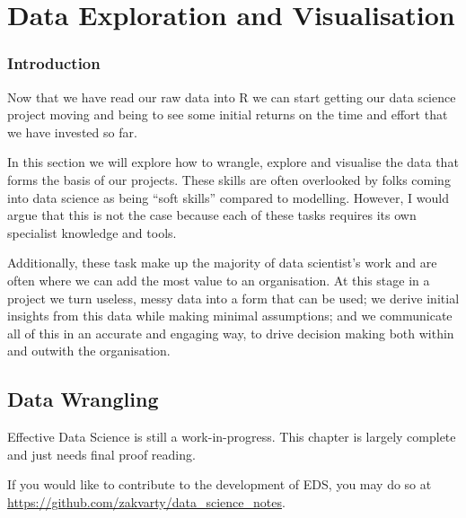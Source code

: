 \documentclass[
  letterpaper,
  DIV=11,
  numbers=noendperiod]{scrreprt}
\begin{document}
\part{Data Exploration and Visualisation}

\section*{Introduction}\label{edav-introduction}


Now that we have read our raw data into R we can start getting our data
science project moving and being to see some initial returns on the time
and effort that we have invested so far.

In this section we will explore how to wrangle, explore and visualise
the data that forms the basis of our projects. These skills are often
overlooked by folks coming into data science as being ``soft skills''
compared to modelling. However, I would argue that this is not the case
because each of these tasks requires its own specialist knowledge and
tools.

Additionally, these task make up the majority of data scientist's work
and are often where we can add the most value to an organisation. At
this stage in a project we turn useless, messy data into a form that can
be used; we derive initial insights from this data while making minimal
assumptions; and we communicate all of this in an accurate and engaging
way, to drive decision making both within and outwith the organisation.

\chapter{Data Wrangling}\label{edav-wrangling}

\begin{tcolorbox}[enhanced jigsaw, coltitle=black, opacityback=0, left=2mm, titlerule=0mm, breakable, colback=white, opacitybacktitle=0.6, colbacktitle=quarto-callout-note-color!10!white, bottomtitle=1mm, toptitle=1mm, colframe=quarto-callout-note-color-frame, bottomrule=.15mm, leftrule=.75mm, title=\textcolor{quarto-callout-note-color}{\faInfo}\hspace{0.5em}{Note}, toprule=.15mm, arc=.35mm, rightrule=.15mm]

Effective Data Science is still a work-in-progress. This chapter is
largely complete and just needs final proof reading.

If you would like to contribute to the development of EDS, you may do so
at \url{https://github.com/zakvarty/data_science_notes}.

\end{tcolorbox}
\end{document}
